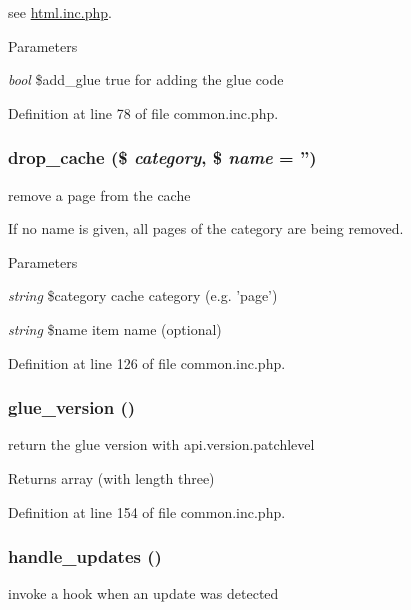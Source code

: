 see \hyperlink{html_8inc_8php}{html.inc.php}. 
\begin{DoxyParams}{Parameters}
\item[{\em bool}]\$add\_\-glue true for adding the glue code \end{DoxyParams}


Definition at line 78 of file common.inc.php.

\hypertarget{common_8inc_8php_a29be04ac495441a2d15a99fa6ef63e9d}{
\subsubsection[{drop\_\-cache}]{\setlength{\rightskip}{0pt plus 5cm}drop\_\-cache (\$ {\em category}, \/  \$ {\em name} = {\ttfamily ''})}}
\label{common_8inc_8php_a29be04ac495441a2d15a99fa6ef63e9d}
remove a page from the cache

If no name is given, all pages of the category are being removed. 
\begin{DoxyParams}{Parameters}
\item[{\em string}]\$category cache category (e.g. 'page') \item[{\em string}]\$name item name (optional) \end{DoxyParams}


Definition at line 126 of file common.inc.php.

\hypertarget{common_8inc_8php_a0d6d0da45f4adf6283bcccec9fd107e3}{
\subsubsection[{glue\_\-version}]{\setlength{\rightskip}{0pt plus 5cm}glue\_\-version ()}}
\label{common_8inc_8php_a0d6d0da45f4adf6283bcccec9fd107e3}
return the glue version with api.version.patchlevel

\begin{DoxyReturn}{Returns}
array (with length three) 
\end{DoxyReturn}


Definition at line 154 of file common.inc.php.

\hypertarget{common_8inc_8php_aa8712e8d1a52e2b8f00ecaf839205d24}{
\subsubsection[{handle\_\-updates}]{\setlength{\rightskip}{0pt plus 5cm}handle\_\-updates ()}}
\label{common_8inc_8php_aa8712e8d1a52e2b8f00ecaf839205d24}
invoke a hook when an update was detected 

